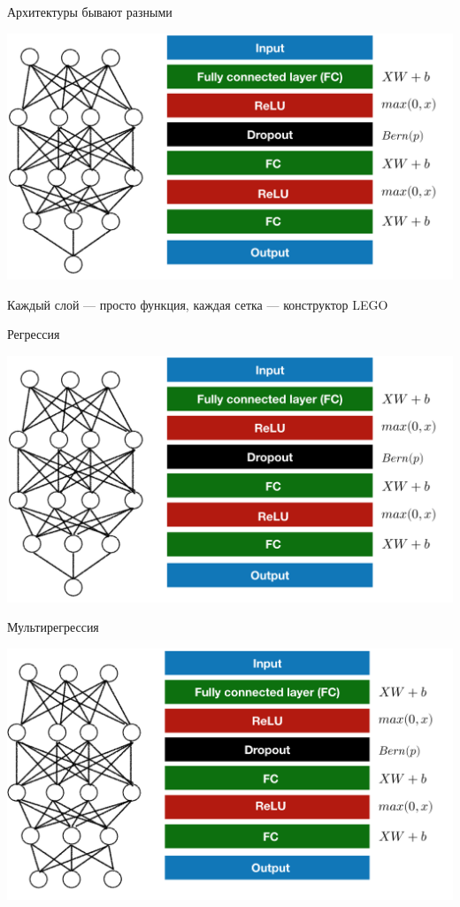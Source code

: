 \documentclass[notes,12pt, aspectratio=169]{beamer}
\begin{document}
\begin{frame}{Архитектуры бывают разными}
	\begin{center}
		\includegraphics[width=0.75\paperwidth]{nn_lego_1.png}
	\end{center}
	Каждый слой — просто функция, каждая сетка — конструктор LEGO
\end{frame}


\begin{frame}{Регрессия}
\begin{center}
	\includegraphics[width=0.75\paperwidth]{nn_lego_1.png}
\end{center}
\end{frame}

\begin{frame}{Мультирегрессия}
\begin{center}
	\includegraphics[width=0.75\paperwidth]{nn_lego_regr.png}
\end{center}
\end{frame}
\end{document}
